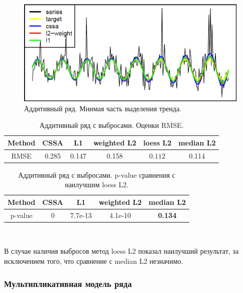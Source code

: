 \documentclass[specialist,
               substylefile = spbu.rtx,
               subf,href,colorlinks=true, 12pt]{disser}
\begin{document}
\begin{figure}[H]
	\begin{center}
		\includegraphics[width=0.67\linewidth]{img/analys_1_Im.png}
	\end{center}
	\caption{Аддитивный ряд. Мнимая часть выделения тренда.}
	\label{analys_Im_1}
\end{figure}

\begin{table}[H]
	\begin{center}
		\caption{Аддитивный ряд с выбросами. Оценки RMSE.}
		\label{tab2}
		\begin{tabular}{|c|c|c|c|c|c|}
			\hline
			Method 	& CSSA & L1 & weighted L2 & loess L2 & median L2 \\
			\hline
			RMSE & 0.285  & 0.147  & 0.158 & $\mathbf{0.112}$ & 0.114\\
			\hline
		\end{tabular}
	\end{center}
\end{table}

\begin{table}[H]
	\caption{Аддитивный ряд с выбросами. p-value сравнения с наилучшим loess L2.}
	\label{tab: pval2}
	\begin{center}
		\begin{tabular}{|c|c|c|c|c|}
			\hline
			Method & CSSA	& L1 & weighted L2 & median L2 \\
			\hline
			p-value & 0  & 7.7e-13 &   4.1e-10  &  \textbf{0.134} \\
			\hline
		\end{tabular} \\
	\end{center}
\end{table}

В случае наличия выбросов метод loess L2 показал наилучший результат, за исключением того, что сравнение с median L2 незначимо.


\subsubsection{Мультипликативная модель ряда}
\end{document}
